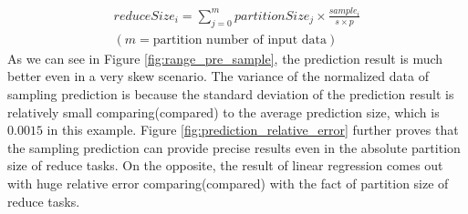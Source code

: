 \begin{equation}
\label{equationsample} 
\begin{aligned}
	reduceSize_i = {\displaystyle\sum_{j=0}^{m} {partitionSize_j \times \frac{sample_i}{s \times p}}} \\ 
	{\left( m = \text{partition number of input data} \right)}
\end{aligned}
\end{equation}
As we can see in Figure \ref{fig:range_pre_sample}, the prediction result is much better even in a very skew scenario. The variance of the normalized data of sampling prediction is because the standard deviation of the prediction result is relatively small comparing(compared) to the average prediction size, which is $0.0015$ in this example. Figure \ref{fig:prediction_relative_error} further proves that the sampling prediction can provide precise results even in the absolute partition size of reduce tasks. On the opposite, the result of linear regression comes out with huge relative error comparing(compared) with the fact of partition size of reduce tasks.
